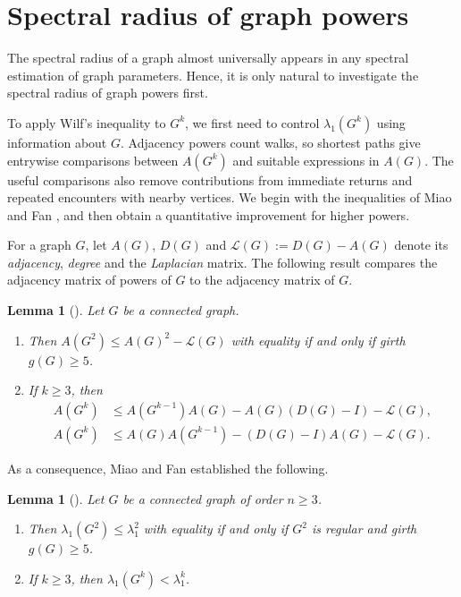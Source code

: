 \documentclass[11pt]{article}
\theoremstyle{plain}
\newtheorem{lemma}[theorem]{Lemma}
\numberwithin{equation}{section}
\begin{document}
\section{Spectral radius of graph powers}\label{sec:spectral_radius}

The spectral radius of a graph almost universally appears in any spectral estimation of graph parameters. Hence, it is only natural to investigate the spectral radius of graph powers first. 


To apply Wilf's inequality to $G^k$, we first need to control $\lambda_1(G^k)$ using information about $G$. Adjacency powers count walks, so shortest paths give entrywise comparisons between $A(G^k)$ and suitable expressions in $A(G)$. The useful comparisons also remove contributions from immediate returns and repeated encounters with nearby vertices. We begin with the inequalities of Miao and Fan \cite{Miao_Fan_2014}, and then obtain a quantitative improvement for higher powers. 

For a graph $G$, let $A(G)$, $D(G)$ and $\mathcal{L}(G) := D(G) - A(G)$ denote its \emph{adjacency}, \emph{degree} and the \emph{Laplacian} matrix. The following result compares the adjacency matrix of powers of $G$ to the adjacency matrix of $G$.  

\begin{lemma}[\cite{Miao_Fan_2014}]\label{lemma:adjacency_graph_powers} Let $G$ be a connected graph.
\begin{enumerate}
    \item Then $A(G^2)\le A(G)^2 - \mathcal{L}(G)$ with equality if and only if girth $g(G)\ge 5$. 
    \item If $k\ge 3$, then 
    \begin{align*}
    A(G^k) & \le A(G^{k-1})A(G) - A(G)(D(G)-I) - \mathcal{L}(G),\\
    A(G^k) & \le A(G)A(G^{k-1}) - (D(G)-I)A(G) - \mathcal{L}(G).
    \end{align*}
\end{enumerate}
\end{lemma}

As a consequence, Miao and Fan \cite{Miao_Fan_2014} established the following.

\begin{lemma}[\cite{Miao_Fan_2014}]\label{lemma:spectral_radius_powers}
    Let $G$ be a connected graph of order $n\ge 3$. 
    \begin{enumerate}[$(i)$]
        \item Then $\lambda_1(G^2)\le \lambda_1^2$ with equality if and only if $G^2$ is regular and girth $g(G)\ge 5$. 
        \item If $k\ge 3$, then $\lambda_1(G^k) < \lambda_1^k$. 
    \end{enumerate}
\end{lemma}
\end{document}
